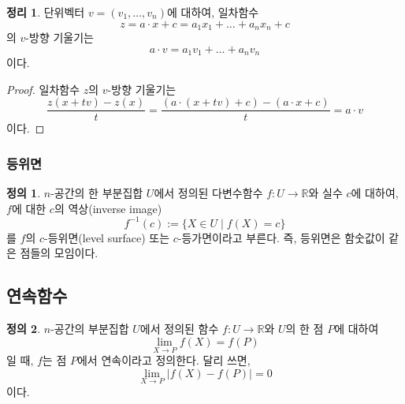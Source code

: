 \documentclass[unfonts,oneside,a4paper]{oblivoir}
\theoremstyle{definition}
\newtheorem{definition}{정의}[subsubsection]
\theoremstyle{theorem}
\newtheorem{theorem}{정리}[subsubsection]
\renewcommand{\vec}[1]{\bm{\mathit{#1}}}
\begin{document}
\begin{theorem}
    단위벡터 $\vec v = (v_1, \dots, v_n)$에 대하여, 일차함수
    \begin{equation*}
        z = \vec a \cdot \vec x + c = a_1 x_1 + \dots + a_n x_n + c
    \end{equation*}
    의 $\vec v$-방향 기울기는
    \begin{equation*}
        \vec a \cdot \vec v = a_1 v_1 + \dots + a_n v_n
    \end{equation*}
    이다.
\end{theorem}

\begin{proof}
    일차함수 $z$의 $\vec v$-방향 기울기는
    \begin{equation*}
        \frac{z(\vec x + t \vec v) - z(\vec x)}{t} = \frac{(\vec a \cdot (\vec x + t \vec v) + c) - (\vec a \cdot \vec x + c)}{t} = \vec a \cdot \vec v
    \end{equation*}
    이다.
\end{proof}

\subsubsection{등위면}

\begin{definition}
    $n$-공간의 한 부분집합 $U$에서 정의된 다변수함수 $f: U \rightarrow \mathbb R$와 실수 $c$에 대하여, $f$에 대한 $c$의 역상(inverse image)
    \begin{equation*}
        f^{-1}(c) := \{X \in U \mid f(X) = c\}
    \end{equation*}
    를 $f$의 $c$-등위면(level surface) 또는 $c$-등가면이라고 부른다.
    즉, 등위면은 함숫값이 같은 점들의 모임이다.
\end{definition}

\subsection{연속함수}

\begin{definition}
    $n$-공간의 부분집합 $U$에서 정의된 함수 $f: U \rightarrow \mathbb R$와 $U$의 한 점 $P$에 대하여
    \begin{equation*}
        \lim_{X \rightarrow P} f(X) = f(P)
    \end{equation*}
    일 때, $f$는 점 $P$에서 연속이라고 정의한다.
    달리 쓰면,
    \begin{equation*}
        \lim_{X \rightarrow P} |f(X) - f(P)| = 0
    \end{equation*}
    이다.
\end{definition}
\end{document}
